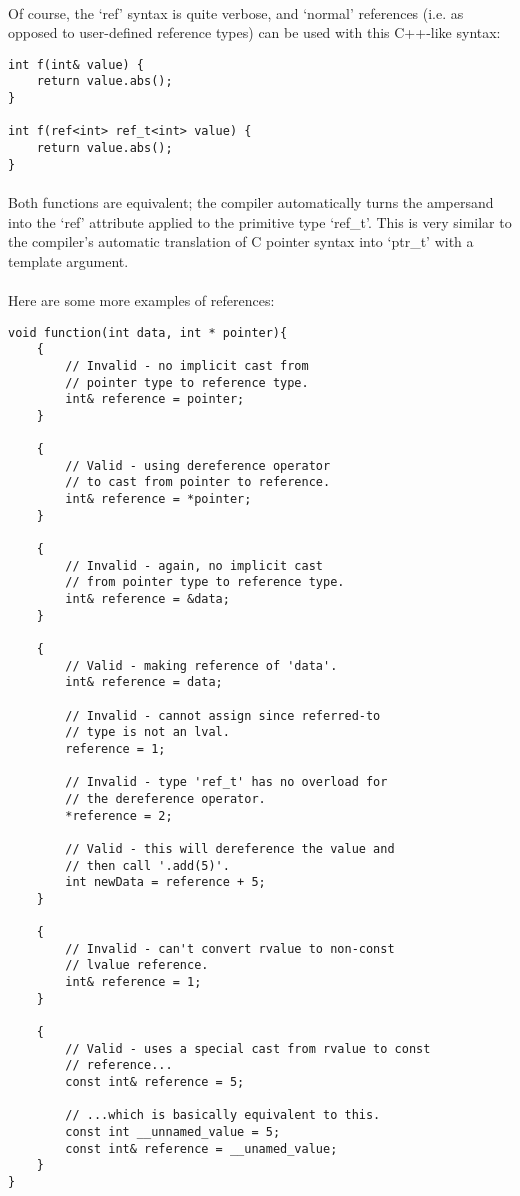 \documentclass[12pt,twoside,notitlepage]{report}
\begin{document}
\paragraph{}
Of course, the `ref' syntax is quite verbose, and `normal' references (i.e. as opposed to user-defined reference types) can be used with this C++-like syntax:

\begin{lstlisting}
int f(int& value) {
	return value.abs();
}

int f(ref<int> ref_t<int> value) {
	return value.abs();
}
\end{lstlisting}

\paragraph{}
Both functions are equivalent; the compiler automatically turns the ampersand into the `ref' attribute applied to the primitive type `ref\_t'. This is very similar to the compiler's automatic translation of C pointer syntax into `ptr\_t' with a template argument.

\paragraph{}
Here are some more examples of references:

\begin{lstlisting}
void function(int data, int * pointer){
	{
		// Invalid - no implicit cast from
		// pointer type to reference type.
		int& reference = pointer;
	}
	
	{
		// Valid - using dereference operator
		// to cast from pointer to reference.
		int& reference = *pointer;
	}
	
	{
		// Invalid - again, no implicit cast
		// from pointer type to reference type.
		int& reference = &data;
	}
	
	{
		// Valid - making reference of 'data'.
		int& reference = data;
	
		// Invalid - cannot assign since referred-to
		// type is not an lval.
		reference = 1;
		
		// Invalid - type 'ref_t' has no overload for
		// the dereference operator.
		*reference = 2;
		
		// Valid - this will dereference the value and
		// then call '.add(5)'.
		int newData = reference + 5;
	}
	
	{
		// Invalid - can't convert rvalue to non-const
		// lvalue reference.
		int& reference = 1;
	}
	
	{	
		// Valid - uses a special cast from rvalue to const
		// reference...
		const int& reference = 5;
		
		// ...which is basically equivalent to this.
		const int __unnamed_value = 5;
		const int& reference = __unamed_value;
	}
}
\end{lstlisting}
\end{document}
